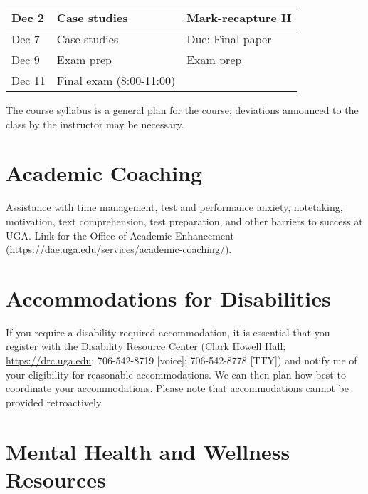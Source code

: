 \documentclass[12pt]{article}
\begin{document}
\begin{center}
\begin{tabular}[c]{lll}
Dec 2      & Case studies                       & Mark-recapture II                   \\
\hline
Dec 7      & Case studies                       & Due: Final paper                     \\
Dec 9      & Exam prep                          & Exam prep                            \\
Dec 11     & Final exam (8:00-11:00)            &                                      \\
\hline \hline
\end{tabular}
\end{center}

The course syllabus is a general plan for the course; deviations announced to the class by the instructor may be necessary.


\clearpage

\vspace{-2mm}
\section*{\normalsize Academic Coaching}
\vspace{-4mm}

Assistance with time management, test and performance anxiety,
notetaking, motivation, text comprehension, test preparation, and
other barriers to success at UGA. Link for the Office of Academic
Enhancement (\url{https://dae.uga.edu/services/academic-coaching/}). 

\vspace{-2mm}
\section*{\normalsize Accommodations for Disabilities}
\vspace{-4mm}

If you require a disability-required accommodation, it is essential
that you register with the Disability Resource Center (Clark Howell
Hall; \url{https://drc.uga.edu}; 706-542-8719 [voice]; 706-542-8778 [TTY])
and notify me of your eligibility for reasonable accommodations. We
can then plan how best to coordinate your accommodations. Please note
that accommodations cannot be provided retroactively.



\vspace{-2mm}
\section*{\normalsize Mental Health and Wellness Resources}
\vspace{-4mm}
\end{document}
